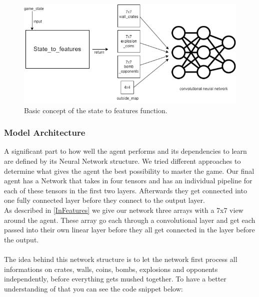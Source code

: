 \begin{figure}[H]
    \centering
    
    \includegraphics[width=\oneImgWidth]{images/chartFinalProjStates}%
    
    \captionadjust%
    \caption{\label{fig:chartFinalProjStates} Basic concept of the state to features function.
    }%
\end{figure}

\subsubsection{Model Architecture} \label{NetworkS}

A significant part to how well the agent performs and its dependencies to learn are defined by its Neural Network structure.
We tried different approaches to determine what gives the agent the best possibility to master the game.
Our final agent has a Network that takes in four tensors and has an individual pipeline for each of these tensors in the first two layers. Afterwards they get connected into one fully connected layer before they connect to the output layer.\\
As described in \ref{InFeatures} we give our network three arrays with a 7x7 view around the agent. These array go each through a convolutional layer and get each passed into their own linear layer before they all get connected in the layer before the output.\\ \\
The idea behind this network structure is to let the network first process all informations on crates, walls, coins, bombs, explosions and opponents independently, before everything gets mushed together.
To have a better understanding of that you can see the code snippet below: 

